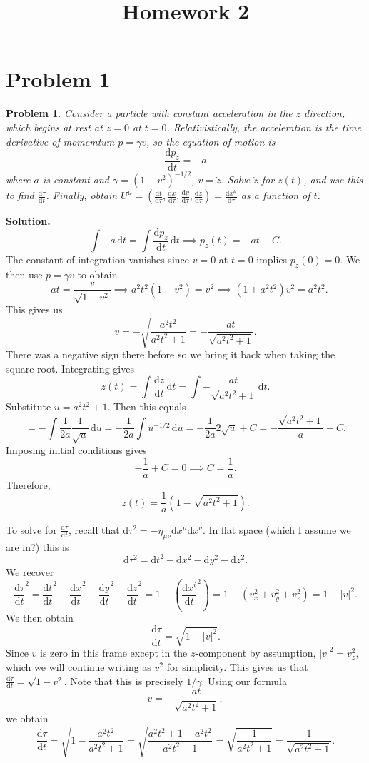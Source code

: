 \documentclass[11pt, letterpaper]{article}
\title{Homework 2}
\theoremstyle{plain}
\newtheorem{problem}{Problem}[section]
\begin{document}
\makeproblem

\section{Problem 1}
\begin{problem}
	Consider a particle with constant acceleration in the $z$ direction, which begins at rest at $z=0$ at $t=0$. Relativistically, the acceleration is the time derivative of momemtum $p=\gamma v$, so the equation of motion is
	\[
		\frac{\mathrm{d}p_z}{\mathrm{d}t} =-a
	\]
	where $a$ is constant and $\gamma =\left( 1-v^2 \right) ^{-1/2} $, $v=\dot{z} $. Solve $\dot{z} $ for $z(t)$, and use this to find $\frac{\mathrm{d}\tau }{\mathrm{d}t} $. Finally, obtain $U^\mu =\left( \frac{\mathrm{d}t}{\mathrm{d}\tau } ,\frac{\mathrm{d}x}{\mathrm{d}\tau } ,\frac{\mathrm{d}y}{\mathrm{d}\tau } ,\frac{\mathrm{d}z}{\mathrm{d}\tau }  \right) =\frac{\mathrm{d}x^\mu }{\mathrm{d}\tau } $ as a function of $t$.
\end{problem}
\noindent\textbf{Solution.}
\[
	\int -a \,\mathrm{d} t=\int \frac{\mathrm{d}p_z}{\mathrm{d}t}  \,\mathrm{d} t\implies p_z(t)=-at +C
.\]
The constant of integration vanishes since $v=0$ at $t=0$ implies $p_z(0)=0$. We then use $p=\gamma v$ to obtain
\[
	-at=\frac{v}{\sqrt{1-v^2} } \implies a^2t^2\left( 1-v^2 \right) =v^2\implies \left( 1+a^2t^2 \right) v^2=a^2t^2
.\]
This gives us
\[
	v=-\sqrt{\frac{a^2t^2}{a^2t^2+1} } =-\frac{at}{\sqrt{a^2t^2+1} } 
.\]
There was a negative sign there before so we bring it back when taking the square root. Integrating gives
\[
	z(t)=\int \frac{\mathrm{d}z}{\mathrm{d}t}  \,\mathrm{d} t=\int -\frac{at}{\sqrt{a^2t^2+1} }  \,\mathrm{d} t
.\]
Substitute $u=a^2t^2+1$. Then this equals
\[
	=-\int \frac{1}{2a} \frac{1}{\sqrt{u} }  \,\mathrm{d} u=-\frac{1}{2a} \int u^{-1/2}  \,\mathrm{d} u=-\frac{1}{2a} 2\sqrt{u} +C=-\frac{\sqrt{a^2t^2+1} }{a} +C
.\]
Imposing initial conditions gives
\[
	-\frac{1}{a} +C=0\implies C=\frac{1}{a} 
.\]
Therefore,
\[
	z(t)=\frac{1}{a} \left( 1-\sqrt{a^2t^2+1} \right) 
.\]

To solve for $\frac{\mathrm{d}\tau }{\mathrm{d}t} $, recall that $\mathrm{d} \tau ^2=-\eta _{\mu \nu } \mathrm{d} x^\mu \mathrm{d} x^\nu $. In flat space (which I assume we are in?) this is
\[
	\mathrm{d} \tau ^2=\mathrm{d} t^2-\mathrm{d} x^2-\mathrm{d} y^2-\mathrm{d} z^2
.\]
We recover
\[
	\frac{\mathrm{d}\tau }{\mathrm{d}t} ^2=\frac{\mathrm{d}t}{\mathrm{d}t} ^2-\frac{\mathrm{d}x}{\mathrm{d}t} ^2-\frac{\mathrm{d}y}{\mathrm{d}t} ^2-\frac{\mathrm{d}z}{\mathrm{d}t}^2 =1-\left( \frac{\mathrm{d}x^i}{\mathrm{d}t} ^2 \right) =1-\left( v_x^2+v_y^2+v_z^2 \right) =1-\left| v \right| ^2
.\]
We then obtain
\[
	\frac{\mathrm{d}\tau }{\mathrm{d}t} =\sqrt{1-\left| v \right| ^2} 
.\]
Since $v$ is zero in this frame except in the $z$-component by assumption, $\left| v \right| ^2=v_z^2$, which we will continue writing as $v^2$ for simplicity. This gives us that $\frac{\mathrm{d}\tau }{\mathrm{d}t} =\sqrt{1-v^2} $. Note that this is precisely $1/\gamma $. Using our formula
\[
	v=-\frac{at}{\sqrt{a^2t^2+1} } ,
\]
we obtain
\[
	\frac{\mathrm{d}\tau }{\mathrm{d}t}=\sqrt{1-\frac{a^2t^2}{a^2t^2+1} } =\sqrt{\frac{a^2t^2+1-a^2t^2}{a^2t^2+1} } =\sqrt{\frac{1}{a^2t^2+1} } =\frac{1}{\sqrt{a^2t^2+1} } 
.\]
\end{document}
